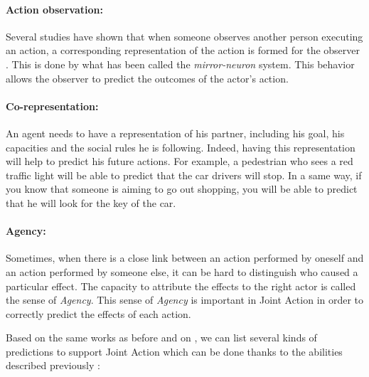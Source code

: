 \documentclass[english,a4paper,11pt,twoside]{StyleThese}
\begin{document}
\paragraph{Action observation:} Several studies have shown that when someone observes another person executing an action, a corresponding representation of the action is formed for the observer \cite{rizzolatti2004mirror}. This is done by what has been called the \textit{mirror-neuron} system. This behavior allows the observer to predict the outcomes of the actor's action. 

\paragraph{Co-representation:} An agent needs to have a representation of his partner, including his goal, his capacities and the social rules he is following. Indeed, having this representation will help to predict his future actions. For example, a pedestrian who sees a red traffic light will be able to predict that the car drivers will stop. In a same way, if you know that someone is aiming to go out shopping, you will be able to predict that he will look for the key of the car.


\paragraph{Agency:} Sometimes, when there is a close link between an action performed by oneself and an action performed by someone else, it can be hard to distinguish who caused a particular effect. The capacity to attribute the effects to the right actor is called the sense of \textit{Agency}. This sense of \textit{Agency} is important in Joint Action in order to correctly predict the effects of each action.

\bigskip
Based on the same works as before and on \cite{sebanz2009prediction}, we can list several kinds of predictions to support Joint Action which can be done thanks to the abilities described previously :
\end{document}
